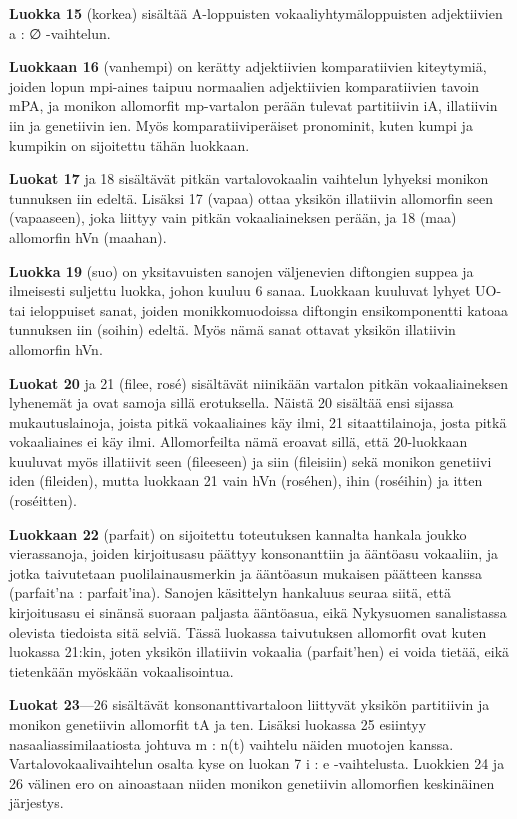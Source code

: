 \documentclass[free]{flammie}
\begin{document}
\textbf{Luokka 15} (korkea) sisältää A-loppuisten vokaaliyhtymäloppuisten adjektiivien
a : ∅ -vaihtelun.

\textbf{Luokkaan 16} (vanhempi) on kerätty adjektiivien komparatiivien kiteytymiä, joiden lopun mpi-aines taipuu normaalien adjektiivien komparatiivien tavoin mPA,
ja monikon allomorfit mp-vartalon perään tulevat partitiivin iA, illatiivin iin ja genetiivin ien. Myös komparatiiviperäiset pronominit, kuten kumpi ja kumpikin on
sijoitettu tähän luokkaan.

\textbf{Luokat 17} ja 18 sisältävät pitkän vartalovokaalin vaihtelun lyhyeksi monikon tunnuksen iin edeltä. Lisäksi 17 (vapaa) ottaa yksikön illatiivin allomorfin seen (vapaaseen), joka liittyy vain pitkän vokaaliaineksen perään, ja 18 (maa) allomorfin
hVn (maahan).

\textbf{Luokka 19} (suo) on yksitavuisten sanojen väljenevien diftongien suppea ja ilmeisesti suljettu luokka, johon kuuluu 6 sanaa. Luokkaan kuuluvat lyhyet UO- tai ieloppuiset sanat, joiden monikkomuodoissa diftongin ensikomponentti katoaa tunnuksen iin (soihin) edeltä. Myös nämä sanat ottavat yksikön illatiivin allomorfin
hVn.

\textbf{Luokat 20} ja 21 (filee, rosé) sisältävät niinikään vartalon pitkän vokaaliaineksen
lyhenemät ja ovat samoja sillä erotuksella. Näistä 20 sisältää ensi sijassa mukautuslainoja, joista pitkä vokaaliaines käy ilmi, 21 sitaattilainoja, josta pitkä vokaaliaines ei käy ilmi. Allomorfeilta nämä eroavat sillä, että 20-luokkaan kuuluvat
myös illatiivit seen (fileeseen) ja siin (fileisiin) sekä monikon genetiivi iden (fileiden), mutta luokkaan 21 vain hVn (roséhen), ihin (roséihin) ja itten (roséitten).

\textbf{Luokkaan 22} (parfait) on sijoitettu toteutuksen kannalta hankala joukko vierassanoja, joiden kirjoitusasu päättyy konsonanttiin ja ääntöasu vokaaliin, ja jotka taivutetaan puolilainausmerkin ja ääntöasun mukaisen päätteen kanssa (parfait’na :
parfait’ina). Sanojen käsittelyn hankaluus seuraa siitä, että kirjoitusasu ei sinänsä
suoraan paljasta ääntöasua, eikä Nykysuomen sanalistassa olevista tiedoista sitä selviä. Tässä luokassa taivutuksen allomorfit ovat kuten luokassa 21:kin, joten
yksikön illatiivin vokaalia (parfait’hen) ei voida tietää, eikä tietenkään myöskään
vokaalisointua.

\textbf{Luokat 23}—26 sisältävät konsonanttivartaloon liittyvät yksikön partitiivin ja monikon genetiivin allomorfit tA ja ten. Lisäksi luokassa 25 esiintyy nasaaliassimilaatiosta johtuva m : n(t) vaihtelu näiden muotojen kanssa. Vartalovokaalivaihtelun osalta kyse on luokan 7 i : e -vaihtelusta. Luokkien 24 ja 26 välinen ero on
ainoastaan niiden monikon genetiivin allomorfien keskinäinen järjestys.
\end{document}
